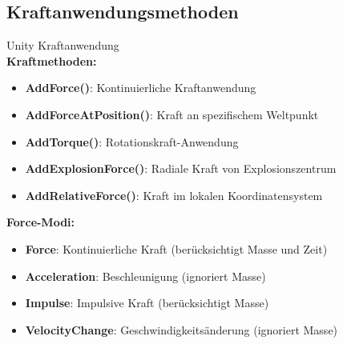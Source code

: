 \subsection{Kraftanwendungsmethoden}

\begin{definition}{Unity Kraftanwendung}\\
    \textbf{Kraftmethoden:}
    \begin{itemize}
        \item \textbf{AddForce()}: Kontinuierliche Kraftanwendung
        \item \textbf{AddForceAtPosition()}: Kraft an spezifischem Weltpunkt
        \item \textbf{AddTorque()}: Rotationskraft-Anwendung
        \item \textbf{AddExplosionForce()}: Radiale Kraft von Explosionszentrum
        \item \textbf{AddRelativeForce()}: Kraft im lokalen Koordinatensystem
    \end{itemize}
    
    \textbf{Force-Modi:}
    \begin{itemize}
        \item \textbf{Force}: Kontinuierliche Kraft (berücksichtigt Masse und Zeit)
        \item \textbf{Acceleration}: Beschleunigung (ignoriert Masse)
        \item \textbf{Impulse}: Impulsive Kraft (berücksichtigt Masse)
        \item \textbf{VelocityChange}: Geschwindigkeitsänderung (ignoriert Masse)
    \end{itemize}
\end{definition}


